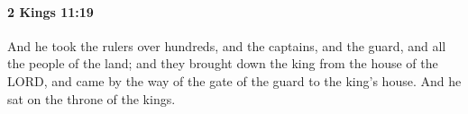 
		\paragraph{2 Kings 11:19} %
			\label{2KINGS-11-19}

			And he took the rulers over hundreds, and the captains, and the guard, and all the people of the land; and they brought down the king from the house of the LORD, and came by the way of the gate of the guard to the king’s house. And he sat on the throne of the kings.


